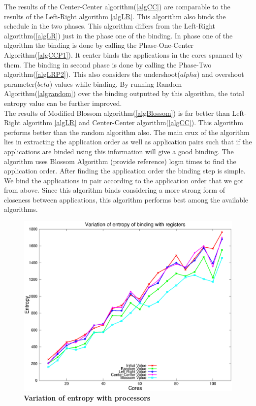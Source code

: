 \documentclass[10pt, conference]{IEEEtran}
\begin{document}
The results of the Center-Center algorithm(\ref{algCC}) are comparable to the results of the Left-Right algorithm \ref{algLR}. This algorithm also binds the schedule in the two phases. This algorithm differs from the Left-Right algorithm(\ref{algLR}) just in the phase one of the binding. In phase one of the algorithm the binding is done by calling the Phase-One-Center Algorithm(\ref{algCCP1}). It center binds the applications in the cores spanned by them. The binding in second phase is done by calling the Phase-Two algorithm(\ref{algLRP2}). This also considers the undershoot($alpha$) and overshoot parameter($beta$) values while binding. By running Random Algorithm(\ref{algrandom}) over the binding outputted by this algorithm, the total entropy value can be further improved.  \ \\

The results of Modified Blossom algorithm(\ref{algBlossom}) is far better than Left-Right algorithm \ref{algLR} and Center-Center algorithm(\ref{algCC}). This algorithm performs better than the random algorithm also. The main crux of the algorithm lies in extracting the application order as well as application pairs such that if the applications are binded using this information will give a good binding. The algorithm uses Blossom Algorithm (provide reference) logm times to find the application order. After finding the application order the binding step is simple. We bind the applications in pair according to the application order that we got from above. Since this algorithm binds considering a more strong form of closeness between applications, this algorithm performs best among the available algorithms.

\begin{figure} [tb]
\centering
\includegraphics[scale=0.45]{figure/data1.eps}
\caption{\textbf{Variation of entropy with processors}}
\label{EntropyVsProc}
\end{figure}
\end{document}
